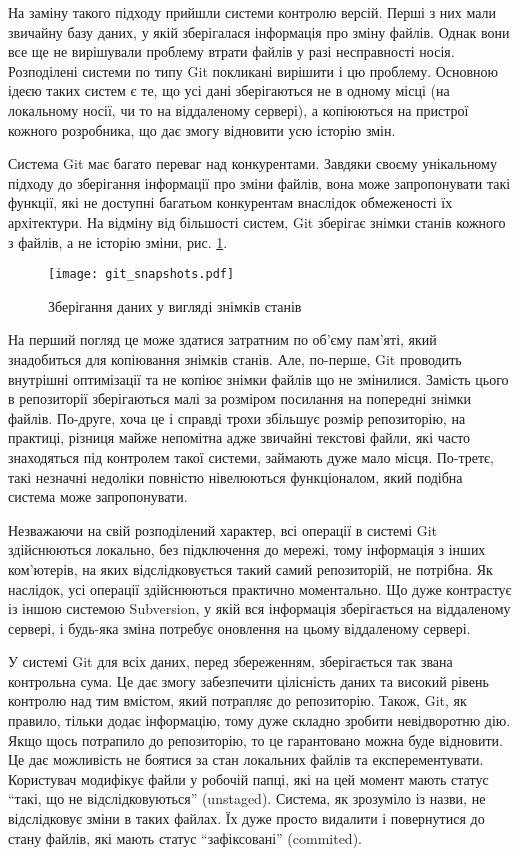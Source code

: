На заміну такого підходу прийшли системи контролю версій. Перші з них мали звичайну
базу даних, у якій зберігалася інформація про зміну файлів. Однак вони все ще не
вирішували проблему втрати файлів у разі несправності носія. Розподілені системи
по типу Git покликані вирішити і цю проблему. Основною ідеєю таких систем є те, що
усі дані зберігаються не в одному місці (на локальному носії, чи то на віддаленому
сервері), а копіюються на пристрої кожного розробника, що дає змогу відновити усю історію
змін.

Система Git має багато переваг над конкурентами. Завдяки своєму унікальному підходу
до зберігання інформації про зміни файлів, вона може запропонувати такі функції,
які не доступні багатьом конкурентам внаслідок обмеженості їх архітектури.
На відміну від більшості систем, Git зберігає знімки станів кожного з файлів, а не історію
зміни, рис. \ref{img:git_snapshots}.

\begin{figure}[ht]
  \begin{center}
    \texttt{[image: git\_snapshots.pdf]}
  \end{center}
  \caption{Зберігання даних у вигляді знімків станів}
  \label{img:git_snapshots}
\end{figure}

На перший погляд це може здатися затратним по об'єму пам'яті, який знадобиться для 
копіювання знімків станів. Але, по-перше,
Git проводить внутрішні оптимізації та не копіює знімки
файлів що не змінилися. Замість цього в репозиторії зберігаються малі за розміром посилання
на попередні знімки файлів. По-друге, хоча це і справді трохи збільшує розмір репозиторію,
на практиці, різниця майже непомітна адже звичайні текстові файли, які часто знаходяться
під контролем такої системи, займають дуже мало місця. По-третє, такі незначні недоліки
повністю нівелюються функціоналом, який подібна система може запропонувати.

Незважаючи на свій розподілений характер, всі операції в системі Git здійснюються локально,
без підключення до мережі, тому інформація з інших ком'ютерів, на яких відслідковується
такий самий репозиторій, не потрібна. Як наслідок, усі операції здійснюються практично
моментально. Що дуже контрастує із іншою системою Subversion, у якій вся інформація
зберігається на віддаленому сервері, і будь-яка зміна потребує оновлення на цьому
віддаленому сервері.

У системі Git для всіх даних, перед збереженням, зберігається так звана контрольна сума.
Це дає змогу забезпечити цілісність даних та високий рівень контролю над тим
вмістом, який потрапляє до репозиторію. Також, Git, як правило, тільки додає
інформацію, тому дуже складно зробити невідворотню дію. Якщо щось потрапило до
репозиторію, то це гарантовано можна буде відновити. Це дає можливість не боятися
за стан локальних файлів та експерементувати. Користувач модифікує файли у робочій папці,
які на цей момент мають статус ``такі, що не відслідковуються'' (unstaged). Система,
як зрозуміло із назви, не відслідковує зміни в таких файлах. Їх дуже просто видалити
і повернутися до стану файлів, які мають статус ``зафіксовані'' (commited).

